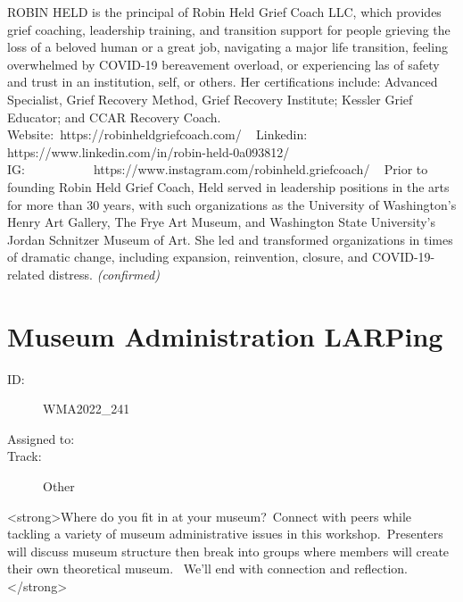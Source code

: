 \documentclass{report}
\begin{document}
                ROBIN HELD is the principal of Robin Held Grief Coach LLC, which provides grief coaching, leadership training, and transition support for people grieving the loss of a beloved human or a great job, navigating a major life transition, feeling overwhelmed by COVID-19 bereavement overload, or experiencing las of safety and trust in an institution, self, or others. Her certifications include: Advanced Specialist, Grief Recovery Method, Grief Recovery Institute; Kessler Grief Educator; and CCAR Recovery Coach.
 
Website: https://robinheldgriefcoach.com/
 
Linkedin: https://www.linkedin.com/in/robin-held-0a093812/
 
IG:           https://www.instagram.com/robinheld.griefcoach/
 
Prior to founding Robin Held Grief Coach, Held served in leadership positions in the arts for more than 30 years, with such organizations as the University of Washington’s Henry Art Gallery, The Frye Art Museum, and Washington State University’s Jordan Schnitzer Museum of Art. She led and transformed organizations in times of dramatic change, including expansion, reinvention, closure, and COVID-19-related distress.
                \emph{ (confirmed) }
              

              

              

              
        
          \newpage
          \section{ Museum Administration LARPing }
            \begin{description}
              \item [ID:]
              WMA2022\_241

              \item [Assigned to:]
                \item [Track:]Other~
              \end{description}

              <strong>Where do you fit in at your museum? Connect with peers while tackling a variety of museum administrative issues in this workshop. Presenters will discuss museum structure then break into groups where members will create their own theoretical museum.  We’ll end with connection and reflection.</strong>
\end{document}
